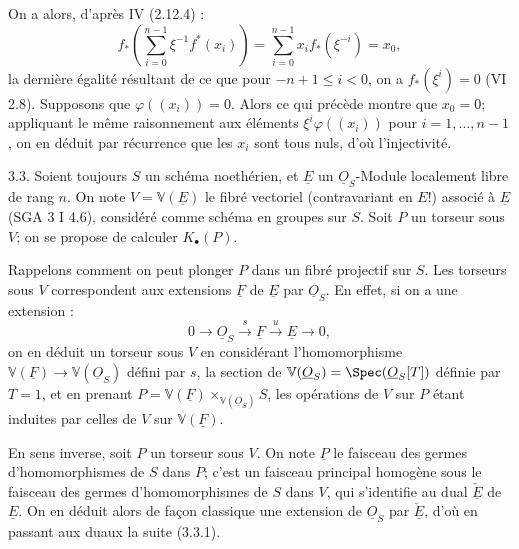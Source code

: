 
On a alors, d'après IV (2.12.4) :
\[
f_*\left(\sum_{i=0}^{n-1}\xi^{-1}f^*(x_i)\right)
=\sum_{i=0}^{n-1}x_i f_*(\xi^{-i})=x_0,
\]
la dernière égalité résultant de ce que pour $-n+1\le i<0$, on a $f_*(\xi^i)=0$ (VI 2.8). Supposons que $\varphi((x_i))=0$. Alors ce qui précède montre que $x_0=0$; appliquant le même raisonnement aux éléments $\xi^i\varphi((x_i))$ pour $i=1,\ldots,n-1$, on en déduit par récurrence que les $x_i$ sont tous nuls, d'où l'injectivité.

3.3. Soient toujours $S$ un schéma noethérien, et $\underline{E}$ un $\underline{O}_S$-Module localement libre de rang $n$. On note $V=\mathbb V(\underline{E})$ le fibré vectoriel (contravariant en $E$!) associé à $\underline{E}$ (SGA 3 I 4.6), considéré comme schéma en groupes sur $S$. Soit $P$ un torseur sous $V$; on se propose de calculer $K_\bullet(P)$.

Rappelons comment on peut plonger $P$ dans un fibré projectif sur $S$. Les torseurs sous $V$ correspondent aux extensions $\underline{F}$ de $\underline{E}$ par $\underline{O}_S$. En effet, si on a une extension :
\[
0\longrightarrow \underline{O}_S\xrightarrow{s}\underline{F}\xrightarrow{u}\underline{E}\longrightarrow 0,
\tag{3.3.1}
\]
on en déduit un torseur sous $V$ en considérant l'homomorphisme $\mathbb V(\underline{F})\to \mathbb V(\underline{O}_S)$ défini par $s$, la section de $\mathbb V(\underline{O}_S)=\Spec(\underline{O}_S[T])$ définie par $T=1$, et en prenant $P=\mathbb V(\underline{F})\times_{\mathbb V(\underline{O}_S)}S$, les opérations de $V$ sur $P$ étant induites par celles de $V$ sur $\mathbb V(\underline{F})$.

En sens inverse, soit $P$ un torseur sous $V$. On note $\underline P$ le faisceau des germes d'homomorphismes de $S$ dans $P$; c'est un faisceau principal homogène sous le faisceau des germes d'homomorphismes de $S$ dans $V$, qui s'identifie au dual $\check{\underline{E}}$ de $\underline{E}$. On en déduit alors de façon classique une extension de $\underline{O}_S$ par $\check{\underline{E}}$, d'où en passant aux duaux la suite (3.3.1).

